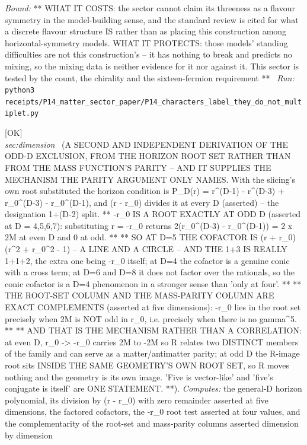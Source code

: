 \begin{description}
 \emph{Bound:} ** WHAT IT COSTS: the sector cannot claim its threeness as a flavour symmetry in the model-building sense, and the standard review is cited for what a discrete flavour structure IS rather than as placing this construction among horizontal-symmetry models. WHAT IT PROTECTS: those models' standing difficulties are not this construction's -- it has nothing to break and predicts no mixing, so the mixing data is neither evidence for it nor against it. This sector is tested by the count, the chirality and the sixteen-fermion requirement **
\ \emph{Run:} \texttt{python3 receipts/P14\_matter\_sector\_paper/P14\_characters\_label\_they\_do\_not\_multiplet.py}
\item[\rcptlabel{P14_odd_D_contains_its_own_image}{P14R42}\textbf{P14R42}\quad\texttt{P14\_odd\_D\_contains\_its\_own\_image}]\hfill\textsf{[OK]}\\
\textit{sec:dimension} \ (A SECOND AND INDEPENDENT DERIVATION OF THE ODD-D EXCLUSION, FROM THE HORIZON ROOT SET RATHER THAN FROM THE MASS FUNCTION'S PARITY -- AND IT SUPPLIES THE MECHANISM THE PARITY ARGUMENT ONLY NAMES. With the slicing's own root substituted the horizon condition is P\_D(r) = r\textasciicircum{}(D-1) - r\textasciicircum{}(D-3) + r\_0\textasciicircum{}(D-3) - r\_0\textasciicircum{}(D-1), and (r - r\_0) divides it at every D (asserted) -- the designation 1+(D-2) split. ** -r\_0 IS A ROOT EXACTLY AT ODD D (asserted at D = 4,5,6,7): substituting r = -r\_0 returns 2(r\_0\textasciicircum{}(D-3) - r\_0\textasciicircum{}(D-1)) = 2 x 2M at even D and 0 at odd. ** ** SO AT D=5 THE COFACTOR IS (r + r\_0)(r\textasciicircum{}2 + r\_0\textasciicircum{}2 - 1) -- A LINE AND A CIRCLE -- AND THE 1+3 IS REALLY 1+1+2, the extra one being -r\_0 itself; at D=4 the cofactor is a genuine conic with a cross term; at D=6 and D=8 it does not factor over the rationals, so the conic cofactor is a D=4 phenomenon in a stronger sense than 'only at four'. ** ** THE ROOT-SET COLUMN AND THE MASS-PARITY COLUMN ARE EXACT COMPLEMENTS (asserted at five dimensions): -r\_0 lies in the root set precisely when 2M is NOT odd in r\_0, i.e. precisely when there is no gamma\textasciicircum{}5. ** ** AND THAT IS THE MECHANISM RATHER THAN A CORRELATION: at even D, r\_0 -> -r\_0 carries 2M to -2M so R relates two DISTINCT members of the family and can serve as a matter/antimatter parity; at odd D the R-image root sits INSIDE THE SAME GEOMETRY'S OWN ROOT SET, so R moves nothing and the geometry is its own image. 'Five is vector-like' and 'five's conjugate is itself' are ONE STATEMENT. **). 
\emph{Computes:} the general-D horizon polynomial, its division by (r - r\_0) with zero remainder asserted at five dimensions, the factored cofactors, the -r\_0 root test asserted at four values, and the complementarity of the root-set and mass-parity columns asserted dimension by dimension

\end{description}
